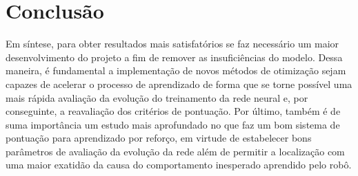 

\chapter{Conclusão}
\label{cap:conclusao}

Em síntese, para obter resultados mais satisfatórios se faz necessário um maior desenvolvimento do projeto a fim de remover as insuficiências do modelo. Dessa maneira, é fundamental a implementação de novos métodos de otimização sejam capazes de acelerar o processo de aprendizado de forma que se torne possível uma mais rápida avaliação da evolução do treinamento da rede neural e, por conseguinte, a reavaliação dos critérios de pontuação. Por último, também é de suma importância um estudo mais aprofundado no que faz um bom sistema de pontuação para aprendizado por reforço, em virtude de estabelecer bons parâmetros de avaliação da evolução da rede além de permitir a localização com uma maior exatidão da causa do comportamento inesperado aprendido pelo robô.
